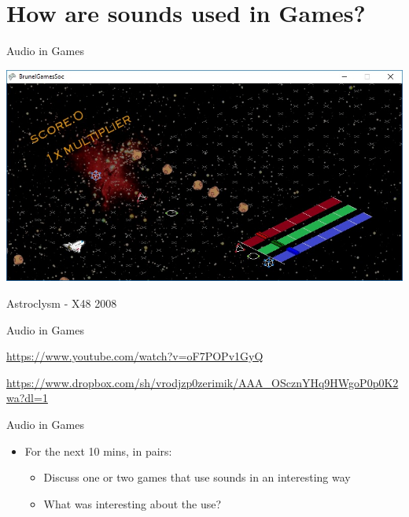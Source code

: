 \part{How are sounds used in Games?}
\frame{\partpage}

\begin{frame}{Audio in Games}

\begin{center}
	\includegraphics[width=\linewidth,height=0.8\textheight,keepaspectratio]{astroclysm}

	\vspace{1em}

	Astroclysm - X48 2008
\end{center}

\end{frame}

\begin{frame}{Audio in Games}

\begin{center}
	\url{https://www.youtube.com/watch?v=oF7POPv1GyQ}

	\vspace{1em}
		
	\url{https://www.dropbox.com/sh/vrodjzp0zerimik/AAA_OScznYHq9HWgoP0p0K2wa?dl=1}	
\end{center}

\end{frame}

\begin{frame}{Audio in Games}

\begin{itemize}
	\item For the next 10 mins, in pairs:
	\begin{itemize}
		\item Discuss one or two games that use sounds in an interesting way
		\item What was interesting about the use?
	\end{itemize}
\end{itemize}

\end{frame}